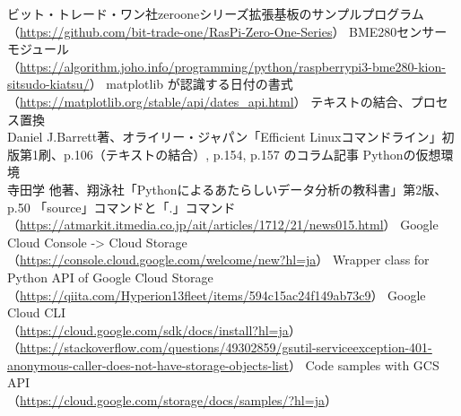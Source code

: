 \documentclass[12pt,a4paper,uplatex]{jsbook}
\begin{document}
\begin{thebibliography}{99}
	 ビット・トレード・ワン社zerooneシリーズ拡張基板のサンプルプログラム\\
	（\url{https://github.com/bit-trade-one/RasPi-Zero-One-Series}）
	 BME280センサーモジュール\\
	（\url{https://algorithm.joho.info/programming/python/raspberrypi3-bme280-kion-sitsudo-kiatsu/}）
	 matplotlib が認識する日付の書式\\
	（\url{https://matplotlib.org/stable/api/dates_api.html}）
	 テキストの結合、プロセス置換\\
	Daniel J.Barrett著、オライリー・ジャパン「Efficient Linuxコマンドライン」初版第1刷、p.106（テキストの結合）, p.154, p.157 のコラム記事
	 Pythonの仮想環境\\
	寺田学 他著、翔泳社「Pythonによるあたらしいデータ分析の教科書」第2版、p.50
	 「source」コマンドと「.」コマンド\\
	（\url{https://atmarkit.itmedia.co.jp/ait/articles/1712/21/news015.html}）
	 Google Cloud Console -> Cloud Storage\\
	（\url{https://console.cloud.google.com/welcome/new?hl=ja}）
	 Wrapper class for Python API of Google Cloud Storage\\
	（\url{https://qiita.com/Hyperion13fleet/items/594c15ac24f149ab73c9}）
	 Google Cloud CLI\\
	（\url{https://cloud.google.com/sdk/docs/install?hl=ja}）\\
	（\url{https://stackoverflow.com/questions/49302859/gsutil-serviceexception-401-anonymous-caller-does-not-have-storage-objects-list}）
	 Code samples with GCS API\\
	（\url{https://cloud.google.com/storage/docs/samples/?hl=ja}）
\end{thebibliography}
\end{document}
